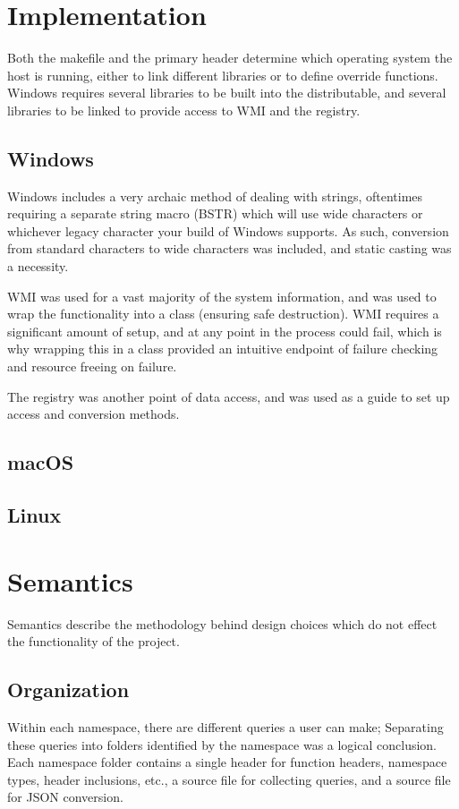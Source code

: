 \documentclass[conference]{IEEEtran}
\begin{document}
\section{Implementation}
Both the makefile and the primary header determine which operating system the host is running,
either to link different libraries or to define override functions.
Windows requires several libraries to be built into the distributable, and several libraries to
be linked to provide access to WMI and the registry.

\subsection{Windows}
Windows includes a very archaic method of dealing with strings, oftentimes requiring a separate string macro (BSTR)
which will use wide characters or whichever legacy character your build of Windows supports.
As such, conversion from standard characters to wide characters was included, and static casting was a necessity.

WMI was used for a vast majority of the system information,
and \cite{whims:wmi} was used to wrap the functionality into a class (ensuring safe destruction).
WMI requires a significant amount of setup, and at any point in the process could fail, which is why
wrapping this in a class provided an intuitive endpoint of failure checking and resource freeing on failure.

The registry was another point of data access, and \cite{dicanio:winreg} was used as a guide to set up
access and conversion methods.

\subsection{macOS}

\subsection{Linux}

\section{Semantics}
Semantics describe the methodology behind design choices which do not effect the functionality of the project.

\subsection{Organization}
Within each namespace, there are different queries a user can make;
Separating these queries into folders identified by the namespace was a logical conclusion.
Each namespace folder contains a single header for function headers, namespace types, header inclusions, etc.,
a source file for collecting queries, and a source file for JSON conversion.
\end{document}
